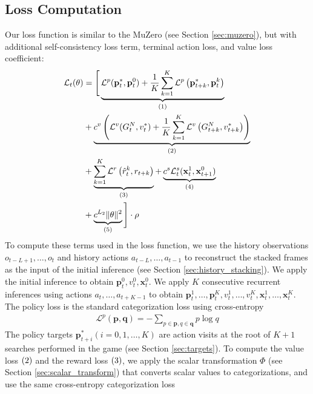 \subsection{Loss Computation} \label{sec:loss}
Our loss function is similar to the MuZero (see Section \ref{sec:muzero}), but with additional self-consistency loss term, terminal action loss, and value loss coefficient:
\begin{align*}
    \mathcal{L}_{t}(\theta)
      & =
    \Bigg[
    \underbrace{\mathcal{L}^p(\mathbf{p}^*_t, \mathbf{p}^0_t) + \frac{1}{K}\sum_{k=1}^{K} \mathcal{L}^{p}\left(\mathbf{p}^*_{t+k}, \mathbf{p}_{t}^{k}\right)}_{(1)}  \\
      & +
    \underbrace{c^v\left(\mathcal{L}^v(G^N_{t}, v^*_t) + \frac{1}{K}\sum_{k=1}^{K} \mathcal{L}^{v}\left(G^N_{t+k}, v^*_{t+k}\right) \right)}_{(2)}  \\
      & +
    \underbrace{\sum_{k=1}^{K} \mathcal{L}^{r}\left(\hat{r}_t^k, r_{t+k}\right)}_{(3)}
    +
    \underbrace{c^{s}\mathcal{L}^s_t(\mathbf{x}^1_t, \mathbf{x}^0_{t+1})}_{(4)}  \\
      & +
    \underbrace{c^{L_2}\|\theta\|^{2}}_{(5)}
    \Bigg] \cdot \rho
    \\
\end{align*}
To compute these terms used in the loss function, we use the history observations \(o_{t-L+1}, \dots, o_t\) and history actions \(a_{t-L}, \dots, a_{t -1}\) to reconstruct the stacked frames as the input of the initial inference (see Section \ref{sec:history_stacking}).
We apply the initial inference to obtain $\mathbf{p}^0_t, v^0_t, \mathbf{x}^0_t$.
We apply $K$ consecutive recurrent inferences using actions \(a_t, \dots, a_{t+K - 1}\) to obtain \(\mathbf{p}^1_t, \dots, \mathbf{p}^K_t, v^1_t, \dots, v^K_t, \mathbf{x}^1_t, \dots, \mathbf{x}^K_t\).
The policy loss  is the standard categorization loss using cross-entropy
\begin{align*}
    \mathcal{L}^p(\mathbf{p}, \mathbf{q}) = - \sum_{p \in \mathbf{p}, q \in \mathbf{q}} p \log{q}
\end{align*}
The policy targets $\mathbf{p}^*_{t+i} (i = 0, 1, \dots, K)$ are action visits at the root of $K+1$ searches performed in the game (see Section \ref{sec:targets}).
To compute the value loss $(2)$ and the reward loss $(3)$, we apply the scalar transformation $\Phi$ (see Section \ref{sec:scalar_transform}) that converts scalar values to categorizations,
and use the same cross-entropy categorization loss
